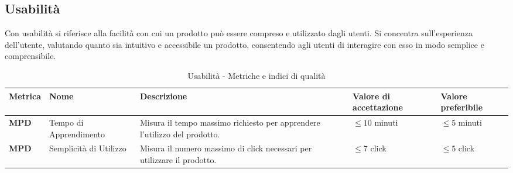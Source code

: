 \subsection{Usabilità}
Con usabilità si riferisce alla facilità con cui un prodotto può essere compreso e utilizzato dagli utenti. Si concentra sull'esperienza dell'utente, valutando quanto sia intuitivo e accessibile un prodotto, consentendo agli utenti di interagire con esso in modo semplice e comprensibile.
\begin{table}[H]
    \centering
    \begin{tabular}{|C{1.5cm}|L{3cm}|L{4cm}|L{2.5cm}|L{2.5cm}|}
        \hline
        \textbf{Metrica} & \textbf{Nome} & \textbf{Descrizione} & \textbf{Valore di accettazione} & \textbf{Valore preferibile} \\
        \hline
        \textbf{MPD} & Tempo di Apprendimento & Misura il tempo massimo richiesto per apprendere l'utilizzo del prodotto. & $\leq 10$ minuti & $\leq 5$ minuti \\
        \hline
        \textbf{MPD} & Semplicità di Utilizzo & Misura il numero massimo di click necessari per utilizzare il prodotto. & $\leq 7$ click & $\leq 5$ click \\
        \hline
    \end{tabular}
    \caption{Usabilità - Metriche e indici di qualità}
    \label{tab:usabilità_qualita_prodotto}
\end{table}

